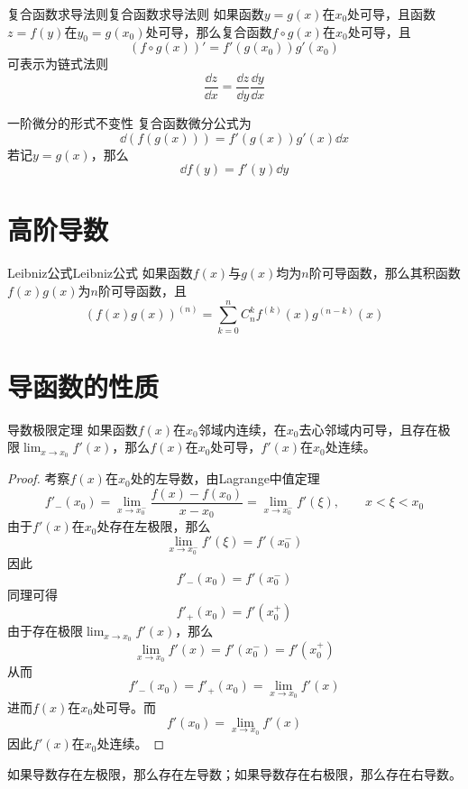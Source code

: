 \documentclass[lang = cn, scheme = chinese, thmcnt = section]{elegantbook}
\begin{document}
\begin{theorem}{复合函数求导法则}{复合函数求导法则}
	如果函数$y=g(x)$在$x_0$处可导，且函数$z=f(y)$在$y_0=g(x_0)$处可导，那么复合函数$f\circ g(x)$在$x_0$处可导，且
	$$
	(f\circ g(x))'
	=f'(g(x_0))g'(x_0)
	$$
	可表示为链式法则
	$$
	\frac{\dd z}{\dd x}
	=\frac{\dd z}{\dd y}\frac{\dd y}{\dd x}
	$$
\end{theorem}

\begin{theorem}{一阶微分的形式不变性}
	复合函数微分公式为
	$$
	\dd (f(g(x)))=f'(g(x))g'(x)\dd x
	$$
	若记$y=g(x)$，那么
	$$
	\dd f(y)=f'(y)\dd y
	$$
\end{theorem}

\section{高阶导数}

\begin{theorem}{Leibniz公式}{Leibniz公式}
	如果函数$f(x)$与$g(x)$均为$n$阶可导函数，那么其积函数$f(x)g(x)$为$n$阶可导函数，且
	$$
	(f(x)g(x))^{(n)}
	=\sum_{k=0}^{n}C_n^k f^{(k)}(x)g^{(n-k)}(x)
	$$
\end{theorem}

\section{导函数的性质}

\begin{theorem}{导数极限定理}
	如果函数$f(x)$在$x_0$邻域内连续，在$x_0$去心邻域内可导，且存在极限$\displaystyle \lim_{x\to x_0} f'(x)$，那么$f(x)$在$x_0$处可导，$f'(x)$在$x_0$处连续。
\end{theorem}

\begin{proof}
	考察$f(x)$在$x_0$处的左导数，由Lagrange中值定理
	$$
	f'_-(x_0)
	=\lim_{x\to x_0^-}\frac{f(x)-f(x_0)}{x-x_0}
	=\lim_{x\to x_0^-}f'(\xi),\qquad x<\xi<x_0
	$$
	由于$f'(x)$在$x_0$处存在左极限，那么
	$$
	\lim_{x\to x_0^-}f'(\xi)=f'(x_0^-)
	$$
	因此
	$$
	f'_-(x_0)=f'(x_0^-)
	$$
	同理可得
	$$
	f'_+(x_0)=f'(x_0^+)
	$$
	由于存在极限$\displaystyle \lim_{x\to x_0} f'(x)$，那么
	$$
	\lim_{x\to x_0} f'(x)=f'(x_0^-)=f'(x_0^+)
	$$
	从而
	$$
	f'_-(x_0)=f'_+(x_0)=\lim_{x\to x_0} f'(x)
	$$
	进而$f(x)$在$x_0$处可导。而
	$$
	f'(x_0)=\lim_{x\to x_0} f'(x)
	$$
	因此$f'(x)$在$x_0$处连续。
\end{proof}

\begin{note}
	如果导数存在左极限，那么存在左导数；如果导数存在右极限，那么存在右导数。
\end{note}
\end{document}
